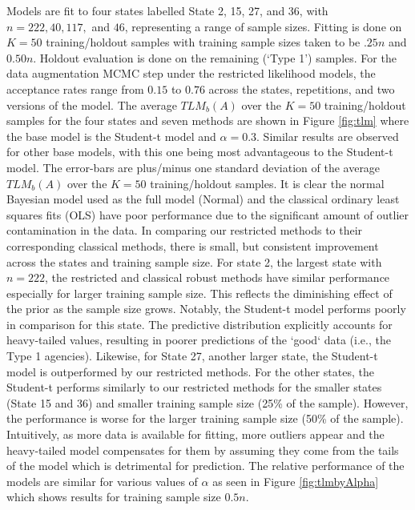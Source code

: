 \documentclass[ba]{imsart}
\begin{document}
Models are fit to four states labelled State 2, 15, 27, and 36, with $n = 222, 40, 117,$ and $46$, representing a range of sample sizes. Fitting is done on $K = 50$ training/holdout samples with training sample sizes taken to be $.25n$ and $0.50n$. Holdout evaluation is done on the remaining (`Type 1') samples. For the data augmentation MCMC step under the restricted likelihood models, the acceptance rates range from  $0.15$ to $0.76$ across the states, repetitions, and two versions of the model. The average $TLM_b(A)$ over the $K = 50$ training/holdout samples for the four states and seven methods are shown in Figure \ref{fig:tlm} where the base model is the Student-t model and $\alpha = 0.3$. Similar results are observed for other base models, with this one being most advantageous to the Student-t model. The error-bars are plus/minus one standard deviation of the average $TLM_b(A)$ over the $K = 50$  training/holdout samples. It is clear the normal Bayesian model used as the full model (Normal) and the classical ordinary least squares fits (OLS) have poor performance due to the significant amount of outlier contamination in the data. In comparing our restricted methods to their corresponding classical methods, there is small, but consistent improvement across the states and training sample size. For state 2, the largest state with $n = 222$, the restricted and classical robust methods have similar performance especially for larger training sample size. This reflects the diminishing effect of the prior as the sample size grows. Notably, the Student-t model performs poorly in comparison for this state. The predictive distribution explicitly accounts for heavy-tailed values, resulting in poorer predictions of the `good` data (i.e., the Type 1 agencies). Likewise, for State 27, another larger state, the Student-t model is outperformed by our restricted methods.   For the other states, the Student-t performs similarly to our restricted methods for the smaller states (State 15 and 36) and smaller training sample size (25\% of the sample). However, the performance is worse for the larger training sample size (50\% of the sample). Intuitively, as more data is available for fitting, more outliers appear and the heavy-tailed model compensates for them by assuming they come from the tails of the model which is detrimental for prediction. The relative performance of the models are similar for various values of $\alpha$ as seen in Figure \ref{fig:tlmbyAlpha} which shows results for training sample size $0.5n$. 
\end{document}
